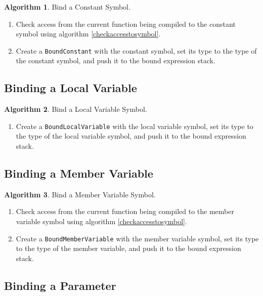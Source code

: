 \documentclass[a4paper,oneside,11pt]{book}
\theoremstyle{definition}
\newtheorem{algo}{Algorithm}[section]
\begin{document}
\begin{algo}\label{bindconstantsymbol} Bind a Constant Symbol.
\begin{enumerate}
\item
Check access from the current function being compiled to the constant symbol using algorithm \ref{checkaccesstosymbol}.
\item
Create a \verb|BoundConstant| with the constant symbol, set its type to the type of the constant symbol, and push it to the bound expression stack.
\end{enumerate}
\end{algo}

\subsection{Binding a Local Variable}

\begin{algo}\label{bindlocalvariablesymbol} Bind a Local Variable Symbol.
\begin{enumerate}
\item
Create a \verb|BoundLocalVariable| with the local variable symbol, set its type to the type of the local variable symbol,
and push it to the bound expression stack.
\end{enumerate}
\end{algo}

\subsection{Binding a Member Variable}

\begin{algo}\label{bindmembervariablesymbol} Bind a Member Variable Symbol.
\begin{enumerate}
\item
Check access from the current function being compiled to the member variable symbol using algorithm \ref{checkaccesstosymbol}.
\item
Create a \verb|BoundMemberVariable| with the member variable symbol, set its type to the type of the member variable,
and push it to the bound expression stack.
\end{enumerate}
\end{algo}

\subsection{Binding a Parameter}
\end{document}
